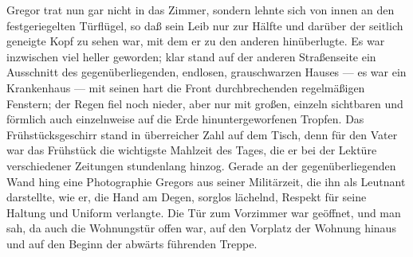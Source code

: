 Gregor trat nun gar nicht in das Zimmer, sondern lehnte sich von innen
an den festgeriegelten Türflügel, so daß sein Leib nur zur Hälfte und
darüber der seitlich geneigte Kopf zu sehen war, mit dem er zu den
anderen hinüberlugte. Es war inzwischen viel heller geworden; klar stand
auf der anderen Straßenseite ein Ausschnitt des gegenüberliegenden,
endlosen, grauschwarzen Hauses --- es war ein Krankenhaus --- mit seinen
hart die Front durchbrechenden regelmäßigen Fenstern; der Regen fiel
noch nieder, aber nur mit großen, einzeln sichtbaren und förmlich auch
einzelnweise auf die Erde hinuntergeworfenen Tropfen. Das
Frühstücksgeschirr stand in überreicher Zahl auf dem Tisch, denn für den
Vater war das Frühstück die wichtigste Mahlzeit des Tages, die er bei
der Lektüre verschiedener Zeitungen stundenlang hinzog. Gerade an der
gegenüberliegenden Wand hing eine Photographie Gregors aus seiner
Militärzeit, die ihn als Leutnant darstellte, wie er, die Hand am Degen,
sorglos lächelnd, Respekt für seine Haltung und Uniform verlangte. Die
Tür zum Vorzimmer war geöffnet, und man sah, da auch die Wohnungstür
offen war, auf den Vorplatz der Wohnung hinaus und auf den Beginn der
abwärts führenden Treppe.

